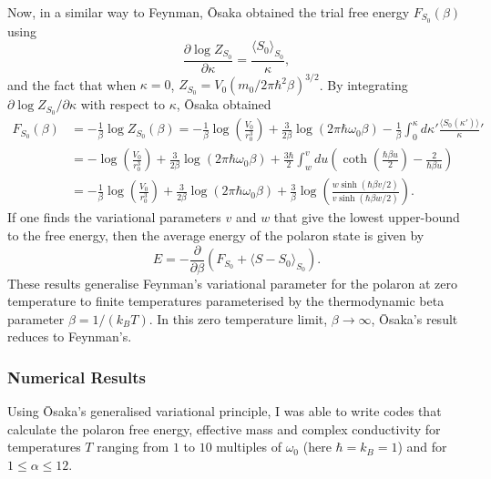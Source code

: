 Now, in a similar way to Feynman, \=Osaka obtained the trial free energy $F_{S_0}(\beta)$ using
\begin{equation}
     \frac{\partial \log Z_{S_0}}{\partial \kappa} = \frac{\langle S_0 \rangle_{S_0}}{\kappa},
\label{eqn-223-29}
\end{equation}
and the fact that when $\kappa = 0$, $Z_{S_0} = V_0 (m_0/2\pi\hbar^2\beta)^{3/2}$. By integrating $\partial \log Z_{S_0} / \partial \kappa$ with respect to $\kappa$, \=Osaka obtained
\begin{equation}
\begin{aligned}
    F_{S_0}(\beta) &= -\frac{1}{\beta} \log Z_{S_0}(\beta) = - \frac{1}{\beta}\log\left(\frac{V_0}{r_0^3}\right) + \frac{3}{2\beta} \log(2\pi \hbar\omega_0\beta) - \frac{1}{\beta}\int^\kappa_0 d\kappa' \frac{\langle S_0(\kappa') \rangle}{\kappa}' \\
    &= - \log\left(\frac{V_0}{r_0^3}\right) + \frac{3}{2\beta} \log(2\pi \hbar\omega_0\beta) + \frac{3\hbar}{2} \int_w^v du \left( \coth \left( \frac{\hbar \beta u}{2}\right) - \frac{2}{\hbar\beta u} \right) \\
    &= - \frac{1}{\beta}\log\left(\frac{V_0}{r_0^3}\right) + \frac{3}{2\beta} \log(2\pi \hbar\omega_0\beta) + \frac{3}{\beta} \log \left( \frac{w \sinh \left( \hbar \beta v / 2 \right)}{v \sinh \left( \hbar \beta w / 2 \right)} \right).
\end{aligned}
\label{eqn-223-30:osaka_trial_energy}
\end{equation}
If one finds the variational parameters $v$ and $w$ that give the lowest upper-bound to the free energy, then the average energy of the polaron state is given by
\begin{equation}
    E = -\frac{\partial}{\partial \beta} \left( F_{S_0} + \langle S - S_0 \rangle_{S_0} \right).
\label{eqn-223-31}
\end{equation}
These results generalise Feynman's variational parameter for the polaron at zero temperature to finite temperatures parameterised by the thermodynamic beta parameter $\beta = 1 / (k_B T)$. In this zero temperature limit, $\beta \to \infty$, \=Osaka's result reduces to Feynman's.

\subsubsection{Numerical Results}
\label{subsubsec:2-2-3-1}

Using \=Osaka's generalised variational principle, I was able to write codes that calculate the polaron free energy, effective mass and complex conductivity for temperatures $T$ ranging from $1$ to $10$ multiples of $\omega_0$ (here $\hbar = k_B = 1$) and for $1\leq\alpha\leq12$. 

